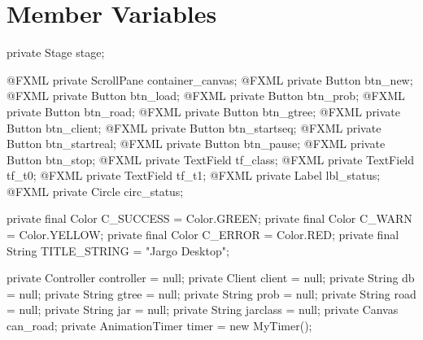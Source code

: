 \section{Member Variables}
\nwenddocs{}\endmoddef{}
private Stage stage;
\nwendcode{}\nwdocspar

\nwenddocs{}\plusendmoddef
@FXML private ScrollPane container_canvas;
@FXML private Button btn_new;
@FXML private Button btn_load;
@FXML private Button btn_prob;
@FXML private Button btn_road;
@FXML private Button btn_gtree;
@FXML private Button btn_client;
@FXML private Button btn_startseq;
@FXML private Button btn_startreal;
@FXML private Button btn_pause;
@FXML private Button btn_stop;
@FXML private TextField tf_class;
@FXML private TextField tf_t0;
@FXML private TextField tf_t1;
@FXML private Label lbl_status;
@FXML private Circle circ_status;
\nwendcode{}\nwdocspar

\nwenddocs{}\plusendmoddef
private final Color C_SUCCESS = Color.GREEN;
private final Color C_WARN = Color.YELLOW;
private final Color C_ERROR = Color.RED;
private final String TITLE_STRING = "Jargo Desktop";
\nwendcode{}\nwdocspar

\nwenddocs{}\plusendmoddef
private Controller controller = null;
private Client client = null;
private String db = null;
private String gtree = null;
private String prob = null;
private String road = null;
private String jar = null;
private String jarclass = null;
private Canvas can_road;
private AnimationTimer timer = new MyTimer();
\nwendcode{}\nwdocspar

